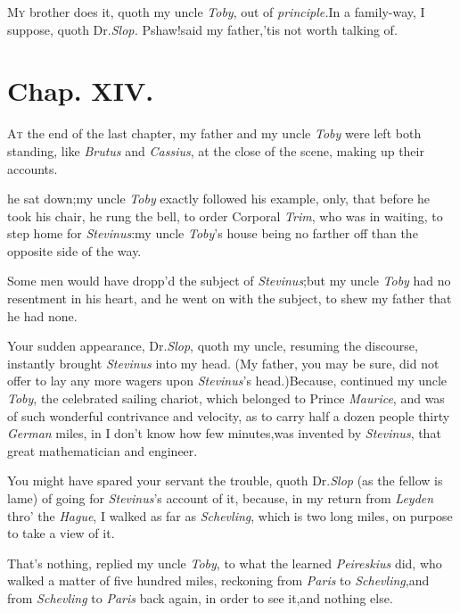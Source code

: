 \documentclass{article}
\begin{document}
\lettrine{M}{y} brother does it, quoth my uncle
\textit{Toby}, out of \textit{principle.}\tsh In a family-way,
I suppose, quoth Dr.\@ \textit{Slop.}\tsh\break
Pshaw!\tsk said my father,\tsk ’tis not worth\break
talking of.

\bigskip

\section{Chap. XIV.}

\lettrine{A}{t} the end of the last chapter, my\break
father and my uncle \textit{Toby} were left both standing, like
\textit{Brutus} and \textit{Cassius}, at the close of the scene, making
up their accounts.

\newpage
\noindent
{}\break
\tsk he sat down;\tsk my uncle \textit{Toby}
exactly followed his example, only, that before he took his chair, he rung the bell,
to order Corporal \textit{Trim}, who was in waiting, to step home for
\textit{Stevinus}:\tsk my uncle \textit{Toby}’s house being no farther off than the
opposite side of the way.

Some men would have dropp’d the subject of
\textit{Stevinus};\tsk but my uncle \textit{Toby} had no resentment
in his heart, and he went on with the subject, to shew my father
that he had none.

Your sudden appearance, Dr.\@ \textit{Slop},\break
quoth my uncle,
resuming the discourse, instantly brought \textit{Stevinus} into my
head. (My father, you may be sure, did not offer to lay any more
wagers upon \textit{Stevinus}’s head.)\tsh Because, continued my\pb
uncle \textit{Toby}, the celebrated sailing chariot,
which belonged to Prince \textit{Maurice}, and was of such wonderful
contrivance and velocity, as to carry half a dozen people thirty
\textit{German} miles, in I don’t know how few
minutes,\tsh was invented by \textit{Stevinus}, that great
mathematician and engineer.

You might have spared your servant the trouble, quoth Dr.\@ \textit{Slop} (as the fellow is lame) of going for
\textit{Stevinus}’s account of it, because, in my return from
\textit{Leyden} thro’ the \textit{Hague}, I walked as far as
\textit{Schev\-ling}, which is two long miles, on
purpose\break 
to take a view of it.

\tsk That’s nothing, replied my uncle \textit{Toby}, to what the
learned \textit{Peireskius} did, who walked a matter of five hundred
miles, reckoning from \textit{Paris} to
\textit{Schevling},\pb and from
\textit{Schevling} to \textit{Paris} back again, in order to see
it,\tsk and nothing else.
\end{document}
